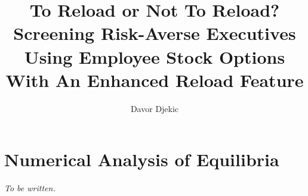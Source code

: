 \documentclass[12pt]{article}
\title{To Reload or Not To Reload?\\ Screening Risk-Averse Executives Using Employee Stock Options With An Enhanced Reload Feature}
\author{Davor Djekic}
\begin{document}
    \maketitle
    \newpage

    \tableofcontents


    
    
    
    
    \section{Numerical Analysis of Equilibria}
        \textit{To be written.}
    

    \listoffigures
    \listoftables
    \newpage
  
    \nocite{*}
    \printbibliography

\end{document}
